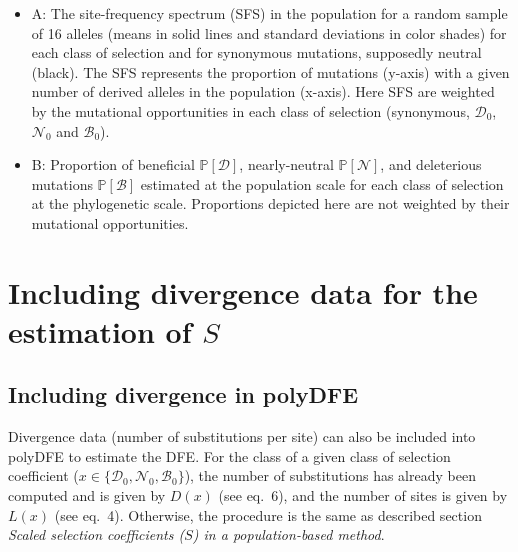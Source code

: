 \documentclass{article}
\newcommand{\proba}{\mathbb{P}}
\newcommand{\SphyDel}{\mathcal{D}_0}
\newcommand{\SphyNeu}{\mathcal{N}_0}
\newcommand{\SphyBen}{\mathcal{B}_0}
\newcommand{\Sphyclass}{x}
\newcommand{\Spop}{S}
\newcommand{\SpopDel}{\mathcal{D}}
\newcommand{\SpopNeu}{\mathcal{N}}
\newcommand{\SpopBen}{\mathcal{B}}
\newcommand{\ProbaPopDel}{\proba [ \SpopDel]}
\newcommand{\ProbaPopNeu}{\proba [ \SpopNeu ]}
\newcommand{\ProbaPopBen}{\proba [ \SpopBen ]}
\begin{document}
    \begin{itemize}[itemsep=0pt]
        \item A: The site-frequency spectrum (SFS) in the population for a random sample of 16 alleles (means in solid lines and standard deviations in color shades) for each class of selection and for synonymous mutations, supposedly neutral (black). The SFS represents the proportion of mutations (y-axis) with a given number of derived alleles in the population (x-axis). Here SFS are weighted by the mutational opportunities in each class of selection (synonymous, $\SphyDel$, $\SphyNeu$ and $\SphyBen$).
        \item B: Proportion of beneficial $\ProbaPopDel$, nearly-neutral $\ProbaPopNeu$, and deleterious mutations $\ProbaPopBen$  estimated at the population scale for each class of selection at the phylogenetic scale. Proportions depicted here are not weighted by their mutational opportunities.
    \end{itemize}

    \newpage
    \section{Including divergence data for the estimation of $\Spop$}

    \subsection{Including divergence in polyDFE}
    Divergence data (number of substitutions per site) can also be included into polyDFE to estimate the DFE.
    For the class of a given class of selection coefficient ($\Sphyclass \in \{\SphyDel, \SphyNeu, \SphyBen \}$), the number of substitutions has already been computed and is given by $D\left( \Sphyclass \right)$ (see eq.~6), and the number of sites is given by $L \left( \Sphyclass \right)$ (see eq.~4).
    Otherwise, the procedure is the same as described section \textit{Scaled selection coefficients ($\Spop$) in a population-based method}.
\end{document}

